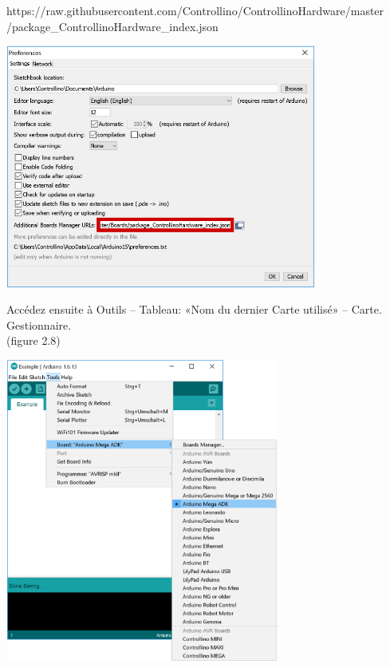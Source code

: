 \documentclass[a4paper,12pt]{report}
\begin{document}
https://raw.githubusercontent.com/Controllino/ControllinoHardware/master\\
/package\_ControllinoHardware\_index.json
\begin{center}
\includegraphics[height=8cm]{ajouter controllino a Arduino ide préférences.png}
\label{}
\end{center}

Accédez ensuite à Outils – Tableau: «Nom du dernier Carte utilisé» – Carte.
Gestionnaire.\\
(figure 2.8)\\

\begin{center}
\includegraphics[height=10cm]{gestion des cart arduino.png}
\label{}
\end{center}
\end{document}
